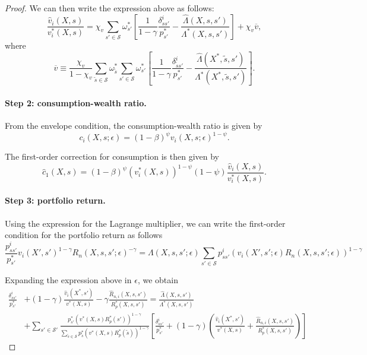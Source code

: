 \begin{proof}
We can then write the expression above as follows:
\begin{equation}
    \frac{\hat{v}_i(X,s)}{v_i^*(X,s)}  =  \chi_v  \sum_{s'\in \mathcal{S}} \omega^*_{s'}\left[\frac{1}{1-\gamma} \frac{\delta_{ss'}^i}{p_{s'}^*} -\frac{\hat{\Lambda}(X,s,s')}{\Lambda^*(X,s,s')} \right] +\chi_v \overline{v},
\end{equation}
where
\begin{equation}
    \overline{v} \equiv \frac{ \chi_v }{1-\chi_v}\sum_{\tilde{s}\in \mathcal{S}}  \omega^*_{\tilde{s}}  \sum_{s'\in \mathcal{S}} \omega^*_{s'}\left[\frac{ 1}{1-\gamma} \frac{\delta_{\tilde{s}s'}^i}{p_{s'}^*} -\frac{\hat{\Lambda}(X^*,\tilde{s},s')}{\Lambda^*(X^*,\tilde{s},s')}  \right].
\end{equation}

\paragraph{Step 2: consumption-wealth ratio.} From the envelope condition, the consumption-wealth ratio is given by
\begin{equation}
    c_i(X,s;\epsilon) = (1-\beta)^\psi v_i(X,s;\epsilon)^{1-\psi}.
\end{equation}

The first-order correction for consumption is then given by
\begin{equation}
    \hat{c}_1(X,s) = (1-\beta)^{\psi} (v_i^*(X,s))^{1-\psi} (1-\psi) \frac{\hat{v}_i(X,s)}{v_i^*(X,s)}.
\end{equation}

\paragraph{Step 3: portfolio return.} 
Using the expression for the Lagrange multiplier, we can write the first-order condition for the portfolio return as follows
\begin{equation}
    \frac{p_{ss'}^i}{p_{s'}^*} v_i(X',s')^{1-\gamma} R_n(X,s,s';\epsilon)^{-\gamma} = \Lambda(X,s,s';\epsilon) \sum_{s'\in \mathcal{S}} p_{ss'}^i(v_i(X',s';\epsilon)R_n(X,s,s';\epsilon) )^{1-\gamma}
\end{equation}

Expanding the expression above in $\epsilon$, we obtain
\begin{align}
    \frac{\delta_{ss'}^i}{p_{s'}^*} &+ (1-\gamma)  \frac{\hat{v}_i(X^*,s')}{v^*(X,s)} -\gamma \frac{\hat{R}_{n,i}(X,s,s')}{R^*_p(X,s,s')} = \frac{\hat{\Lambda}(X,s,s')}{\Lambda^*(X,s,s')}\\
    &+ \sum_{s'\in\mathcal{S}'} \frac{p_{s'}^*(v^*(X,s)R_p^*(s'))^{1-\gamma}}{\sum_{\tilde{s} \in \mathcal{S}} p_{\tilde{s}}^*(v^*(X,s)R_p^*(\tilde{s}))^{1-\gamma}} \left[ \frac{\delta_{ss'}^i}{p_{s'}^*} + (1-\gamma) \left(\frac{\hat{v}_i(X^*,s')}{v^*(X,s)} + \frac{\hat{R}_{n,i}(X,s,s')}{R_p^*(X,s,s')}\right)\right]
\end{align}


\end{proof}
